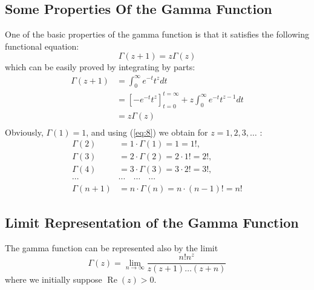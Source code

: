 \documentclass[a4paper,14pt,oneside]{book}
\theoremstyle{plain}
\theoremstyle{definition}
\theoremstyle{remark}
\begin{document}
         \begin{center}
         
\begin{flushleft} 
\justify
\Large{
\subsection{Some Properties Of the Gamma Function}
One of the basic properties of the gamma function is that it satisfies the following functional equation:
\begin{equation}\label{eq:8}
\Gamma(z+1)=z \Gamma(z)
\end{equation}
which can be easily proved by integrating by parts:
$$
\begin{aligned}
\Gamma(z+1)&=\int_{0}^{\infty} e^{-t} t^{z} d t \\
&=\left[-e^{-t} t^{z}\right]_{t=0}^{t=\infty}+z \int_{0}^{\infty} e^{-t} t^{z-1} d t \\
&=z \Gamma(z) \\
\end{aligned}
$$Obviously, $\Gamma(1)=1$, and using (\ref{eq:8}) we obtain for $z=1,2,3, \ldots$ :
$$
\begin{aligned}
\Gamma(2) &=1 \cdot \Gamma(1)=1=1 !, \\
\Gamma(3) &=2 \cdot \Gamma(2)=2 \cdot 1 !=2 !, \\
\Gamma(4) &=3 \cdot \Gamma(3)=3 \cdot 2 !=3 !, \\
\cdots & \cdots \quad \cdots \quad \cdots \\
\Gamma(n+1) &=n \cdot \Gamma(n)=n \cdot(n-1) !=n !
\end{aligned}
$$}
\subsection{Limit Representation of the Gamma Function}
\Large{
The gamma function can be represented also by the limit
\begin{equation}\label{eq:9}
\Gamma(z)=\lim_{n \rightarrow \infty} \frac{n ! n^{z}}{z(z+1) \ldots(z+n)}
\end{equation}
where we initially suppose $\operatorname{Re}(z)>0$.

}
\end{flushleft}
\end{center}
\end{document}

